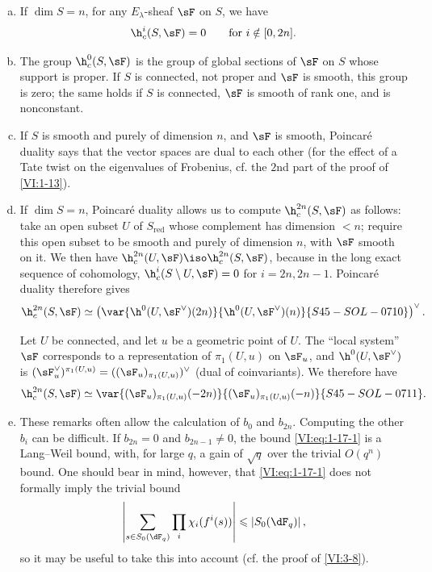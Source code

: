 \begin{enumerate}[a)]
  \item If $\dim S=n$, for any $E_\lambda$-sheaf $\sF$ on $S$, we have 
    \[
      \h_c^i(S,\sF) = 0 \qquad \text{for $i\notin [0,2n]$.}
    \]
  \item The group $\h_c^0(S,\sF)$ is the group of global sections of $\sF$ 
    on $S$ whose support is proper. If $S$ is connected, not proper and 
    $\sF$ is smooth, this group is zero; the same holds if $S$ is connected, 
    $\sF$ is smooth of rank one, and is nonconstant.
  \item If $S$ is smooth and purely of dimension $n$, and $\sF$ is smooth, 
    Poincaré duality says that the vector spaces 
     are dual to each other 
    (for the effect of a Tate twist on the eigenvalues of Frobenius, 
    cf. the $2$nd part of the proof of \ref{VI:1-13}).
  \item If $\dim S=n$, Poincaré duality allows us to compute 
    $\h_c^{2n}(S,\sF)$ as follows: take an open subset $U$ of $S_\text{red}$ 
    whose complement has dimension $<n$; require this open subset to be smooth and 
    purely of dimension $n$, with $\sF$ smooth on it. We then have 
    $\h_c^{2n}(U,\sF) \iso \h_c^{2n}(S,\sF)$, because in the long exact sequence 
    of cohomology, $\h_c^i(S\setminus U,\sF) = 0$ for $i=2n,2n-1$. 
    Poincaré duality therefore gives 
    \[
      \h_c^{2n}(S,\sF) \simeq \left(\var{\h^0(U,\sF^\vee)(2n)}{\h^0(U,\sF^\vee)(n)}{S45-SOL-0710}\right)^\vee \text{.}
    \]
    
    Let $U$ be connected, and let $u$ be a geometric point of $U$. The 
    ``local system'' $\sF$ corresponds to a representation of 
    $\pi_1(U,u)$ on $\sF_u$, and $\h^0(U,\sF^\vee)$ is 
    $(\sF_u^\vee)^{\pi_1(U,u)}=((\sF_u)_{\pi_1(U,u)})^\vee$ (dual of 
    coinvariants). We therefore have 
\[
      \h_c^{2n}(S,\sF) \simeq \var{(\sF_u)_{\pi_1(U,u)}(-2n)}{(\sF_u)_{\pi_1(U,u)}(-n)}{S45-SOL-0711} \text{.}
    \]
  \item These remarks often allow the calculation of $b_0$ and $b_{2n}$. 
    Computing the other $b_i$ can be difficult. If $b_{2n}=0$ and 
    $b_{2n-1}\ne 0$, the bound \eqref{VI:eq:1-17-1} is a Lang--Weil bound, 
    with, for large $q$, a gain of $\sqrt q$ over the 
    trivial $O(q^n)$ bound. One should bear in mind, however, that 
    \eqref{VI:eq:1-17-1} does not formally imply the trivial bound 
    \[
      \left|\sum_{s\in S_0(\dF_q)} \prod_i \chi_i(f^i(s))\right| \leqslant \left| S_0(\dF_q)\right| \text{,}
    \]
    so it may be useful to take this into account (cf. the proof of \ref{VI:3-8}). 
\end{enumerate}

